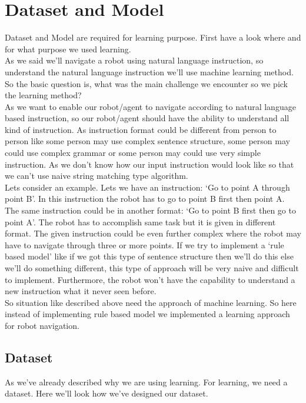 \section{Dataset and Model}
Dataset and Model are required for learning purpose. First have a look where and for what purpose we used learning. \\

As we said we'll navigate a robot using natural language instruction, so understand the natural language instruction we'll use machine learning method. So the basic question is, what was the main challenge we encounter so we pick the learning method? \\

As we want to enable our robot/agent to navigate according to natural language based instruction, so our robot/agent should have the ability to understand all kind of instruction. As instruction format could be different from person to person like some person may use complex sentence structure, some person may could use complex grammar or some person may could use very simple instruction. As we don't know how our input instruction would look like so that we can't use naive string matching type algorithm. \\

Lets consider an example. Lets we have an instruction: `Go to point A through point B'. In this instruction the robot has to go to point B first then point A. The same instruction could be in another format: `Go to point B first then go to point A'. The robot has to accomplish same task but it is given in different format. The given instruction could be even further complex where the robot may have to navigate through three or more points. If we try to implement a `rule based model' like if we got this type of sentence structure then we'll do this else we'll do something different, this type of approach will be very naive and difficult to implement. Furthermore, the robot won't have the capability to understand a new instruction what it never seen before. \\

So situation like described above need the approach of machine learning. So here instead of implementing rule based model we implemented a learning approach for robot navigation. \\

\subsection{Dataset}
As we've already described why we are using learning. For learning, we need a dataset. Here we'll look how we've designed our dataset. \\

